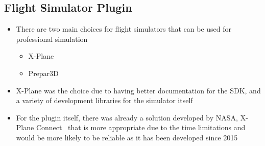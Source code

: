 \documentclass[../dissertation.tex]{subfiles}
\begin{document}
\subsection{Flight Simulator Plugin}
\begin{itemize}
  \item There are two main choices for flight simulators that can be used
    for professional simulation
    \begin{itemize}
      \item X-Plane~\cite{x-plane}
      \item Prepar3D~\cite{p3d}
    \end{itemize}
  \item X-Plane was the choice due to having better documentation for the SDK, and a variety
    of development libraries for the simulator itself
  \item For the plugin itself, there was already a solution developed by NASA, X-Plane Connect~\cite{xpc}
    that is more appropriate due to the time limitations and would be more likely to be reliable
    as it has been developed since 2015
\end{itemize}
\end{document}
